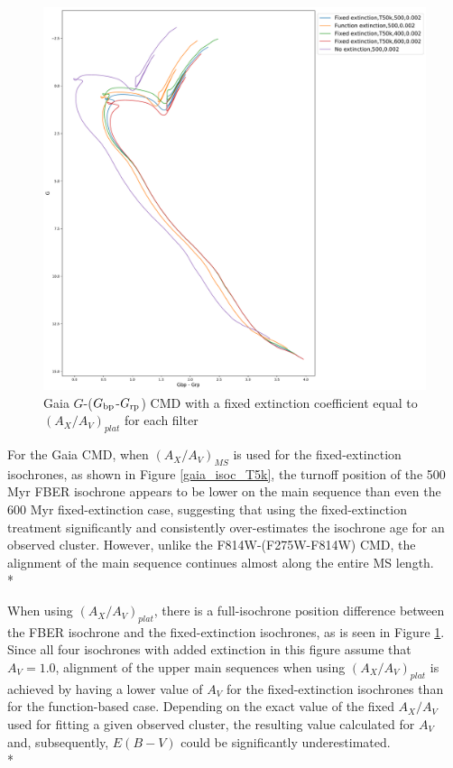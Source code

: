 \documentclass[12pt, a4paper]{report}
\begin{document}
\begin{figure}[h]
\begin{center}
\includegraphics[width=1.0\textwidth]{../basti_isochrones_10_13Gyr/Extinction_T50k_FeH0fix_func_G_GbpmGrp_500_400_600_Myr_FeH_0p002_ref_noext_Av_1p0.pdf}
\caption{Gaia $G$-($G_{\textnormal{bp}}$-$G_{\textnormal{rp}}$) CMD with a fixed extinction coefficient equal to $(A_{X}/A_{V})_{plat}$ for each filter}
\label{gaia_isoc_T50k}
\end{center}
\end{figure}

For the Gaia CMD, when $(A_{X}/A_{V})_{MS}$ is used for the fixed-extinction isochrones, as shown in Figure \ref{gaia_isoc_T5k}, the turnoff position of the 500 Myr FBER isochrone appears to be lower on the main sequence than even the 600 Myr fixed-extinction case, suggesting that using the fixed-extinction treatment significantly and consistently over-estimates the isochrone age for an observed cluster. However, unlike the F814W-(F275W-F814W) CMD, the alignment of the main sequence continues almost along the  entire MS length. \\*

When using $(A_{X}/A_{V})_{plat}$, there is a full-isochrone position difference between the FBER isochrone and the fixed-extinction isochrones, as is seen in Figure \ref{gaia_isoc_T50k}. Since all four isochrones with added extinction in this figure assume that $A_{V} = 1.0$, alignment of the upper main sequences when using $(A_{X}/A_{V})_{plat}$ is achieved by having a lower value of $A_{V}$ for the fixed-extinction isochrones than for the function-based case. Depending on the exact value of the fixed $A_{X}/A_{V}$ used for fitting a given observed cluster, the resulting value calculated for $A_{V}$ and, subsequently, $E(B-V)$ could be significantly underestimated. \\*
\end{document}
